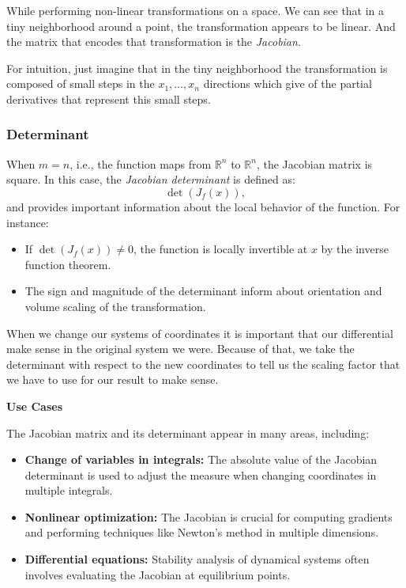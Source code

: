 While performing non-linear transformations on a space. We can see that in a tiny neighborhood
around a point, the transformation appears to be linear. And the matrix that encodes that
transformation is the \emph{Jacobian}.

For intuition, just imagine that in the tiny neighborhood the transformation is composed
of small steps in the \(x_1, \dots, x_n\) directions which give of the partial derivatives that
represent this small steps. 

\subsubsection{Determinant}
When \(m = n\), i.e., the function maps from 
\(\mathbb{R}^n\) to \(\mathbb{R}^n\), 
the Jacobian matrix is square. In this case, 
the \emph{Jacobian determinant} is defined as:
\[
\det(J_{f}(x)),
\]
and provides important information about the local behavior of the function. For instance:
\begin{itemize}[label=\(-\)]
  \item If \(\det(J_{f}(x)) \neq 0\), the function is locally invertible at \(x\) by the inverse 
  function theorem.
  \item The sign and magnitude of the determinant 
  inform about orientation and volume scaling of the transformation.
\end{itemize}

When we change our systems of coordinates it is important
that our differential make sense in the original system we were.
Because of that, we take the determinant with respect to the new
coordinates to tell us the scaling factor that we have to use for our
result to make sense.
\vspace{\baselineskip}

\textbf{Use Cases}
\vspace{\baselineskip}

The Jacobian matrix and its determinant appear in many areas, including:
\begin{itemize}[label=\(-\)]
  \item \textbf{Change of variables in integrals:} The absolute value of the Jacobian determinant is used to adjust the measure when changing coordinates in multiple integrals.
  \item \textbf{Nonlinear optimization:} The Jacobian is crucial for computing gradients and performing techniques like Newton's method in multiple dimensions.
  \item \textbf{Differential equations:} Stability analysis of dynamical systems often involves evaluating the Jacobian at equilibrium points.
\end{itemize}

